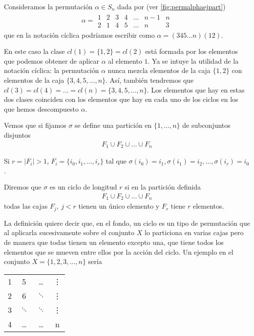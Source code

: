 \begin{ej}
	Consideramos la permutación $\alpha \in S_n$ dada por (ver \autoref{fig:permalphaejpart})
	\begin{align*}
		\alpha = \begin{array}{ccccccc}
		1 & 2 & 3 & 4 & \dots & n-1 & n \\
		2 & 1 & 4 & 5 & \dots & n & 3
		\end{array}
	\end{align*}
	que en la notación cíclica podríamos escribir como $\alpha = (345\dots n)(12)$.
	
	En este caso la clase $cl(1) = \{1, 2\} = cl(2)$ está formada por los elementos que podemos obtener de aplicar $\alpha$ al elemento $1$. Ya se intuye la utilidad de la notación cíclica: la permutación $\alpha$ nunca mezcla elementos de la caja $\{1,2\}$ con elementos de la caja $\{3, 4, 5, \dots, n\}$. Así, también tendremos que $cl(3) = cl(4) = \dots = cl(n) = \{3, 4, 5, \dots, n\}$. Los elementos que hay en estas dos clases coinciden con los elementos que hay en cada uno de los ciclos en los que hemos descompuesto $\alpha$.
\end{ej}

Vemos que si fijamos $\sigma$ se define una partición en $\{1, \dots, n\}$ de subconjuntos disjuntos
\begin{align*}
F_1 \cup F_2 \cup \dots \cup F_n
\end{align*}

Si $r = |F_i| > 1$, $F_i = \{i_0, i_1, \dots, i_r\}$ tal que $\sigma(i_0) = i_1, \sigma(i_1) = i_2, \dots, \sigma(i_r) = i_0$.

\begin{dfn}[Ciclo]
	\label{dfn:ciclo}
	Diremos que $\sigma$ es un ciclo de longitud $r$ si en la partición definida
	\begin{align*}
	F_1 \cup F_2 \cup \dots \cup F_n
	\end{align*}
	todas las cajas $F_j,\ j < r$ tienen un único elemento y $F_r$ tiene $r$ elementos.
\end{dfn}

La definición quiere decir que, en el fondo, un ciclo es un tipo de permutación que al aplicarla sucesivamente sobre el conjunto $X$ lo particiona en varias cajas pero de manera que todas tienen un elemento excepto una, que tiene todos los elementos que se mueven entre ellos por la acción del ciclo. Un ejemplo en el conjunto $X = \{1, 2, 3, \dots, n\}$ sería

\begin{center}
	\begin{tabular}{|c|c|c|c|}
		\hline
		1 & 5 & \dots & \vdots \\\cline{2-4}
		2 & 6 & $\ddots$ & \vdots \\\cline{2-4}
		3 & $\ddots$ & $\ddots$ & \vdots  \\\cline{2-4}
		4 & \dots & \dots & n\\\hline
	\end{tabular}
\end{center}

